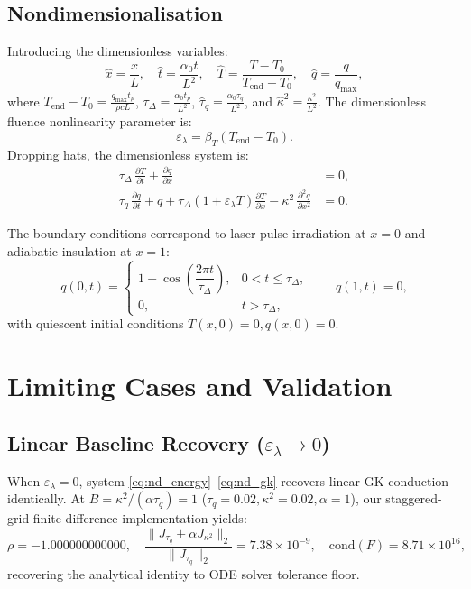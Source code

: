 \documentclass[preprint,12pt,a4paper]{elsarticle}
\begin{document}
\subsection{Nondimensionalisation}
Introducing the dimensionless variables:
\begin{equation}
  \hat{x} = \frac{x}{L}, \quad \hat{t} = \frac{\alpha_0 t}{L^2}, \quad \hat{T} = \frac{T - T_0}{T_{\mathrm{end}} - T_0}, \quad \hat{q} = \frac{q}{q_{\max}} ,
\end{equation}
where $T_{\mathrm{end}} - T_0 = \frac{q_{\max} t_p}{\rho c L}$, $\tau_\Delta = \frac{\alpha_0 t_p}{L^2}$, $\hat{\tau}_q = \frac{\alpha_0 \tau_q}{L^2}$, and $\hat{\kappa}^2 = \frac{\kappa^2}{L^2}$. The dimensionless fluence nonlinearity parameter is:
\begin{equation}
  \varepsilon_\lambda = \beta_T (T_{\mathrm{end}} - T_0) .
\end{equation}
Dropping hats, the dimensionless system is:
\begin{align}
  \tau_\Delta \, \frac{\partial T}{\partial t} + \frac{\partial q}{\partial x} &= 0 , \label{eq:nd_energy} \\
  \tau_q \, \frac{\partial q}{\partial t} + q + \tau_\Delta\left(1 + \varepsilon_\lambda T\right)\frac{\partial T}{\partial x} - \kappa^2 \, \frac{\partial^2 q}{\partial x^2} &= 0 . \label{eq:nd_gk}
\end{align}

The boundary conditions correspond to laser pulse irradiation at $x=0$ and adiabatic insulation at $x=1$:
\begin{equation}
  q(0,t) = \begin{cases} 1 - \cos\left(\dfrac{2\pi t}{\tau_\Delta}\right), & 0 < t \le \tau_\Delta , \\[1ex] 0, & t > \tau_\Delta , \end{cases} \qquad q(1,t) = 0 ,
  \label{eq:bcs}
\end{equation}
with quiescent initial conditions $T(x,0) = 0, q(x,0) = 0$.

\section{Limiting Cases and Validation}

\subsection{Linear Baseline Recovery ($\varepsilon_\lambda \to 0$)}
When $\varepsilon_\lambda = 0$, system \eqref{eq:nd_energy}--\eqref{eq:nd_gk} recovers linear GK conduction identically. At $B = \kappa^2/(\alpha \tau_q) = 1$ ($\tau_q = 0.02, \kappa^2 = 0.02, \alpha = 1$), our staggered-grid finite-difference implementation yields:
\begin{equation}
  \rho = -1.000000000000, \quad \frac{\|J_{\tau_q} + \alpha J_{\kappa^2}\|_2}{\|J_{\tau_q}\|_2} = 7.38 \times 10^{-9}, \quad \mathrm{cond}(F) = 8.71 \times 10^{16} ,
\end{equation}
recovering the analytical identity to ODE solver tolerance floor.
\end{document}
